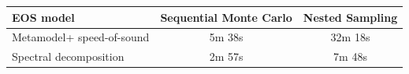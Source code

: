 \renewcommand{\arraystretch}{1.4}
\begin{tabular}{p{4.5cm}cc}
    \hline
    EOS model & Sequential Monte Carlo & Nested Sampling \\
    \hline
    Metamodel\newline + speed-of-sound & 5m 38s & 32m 18s \\
    Spectral decomposition & 2m 57s & 7m 48s \\
    \hline
\end{tabular}
